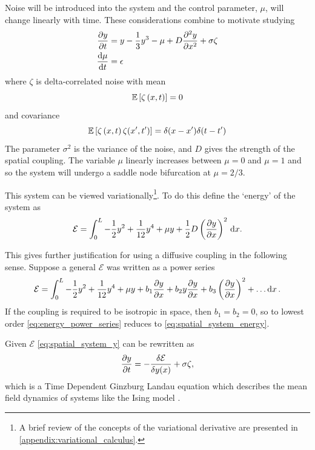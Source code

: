 Noise will be introduced into the system and the control parameter, $\mu$,  will change linearly with time. These considerations combine to motivate studying
\begin{subequations}
\label{eq:spatial_system}
  \begin{align}
    \pdv{y}{t} &= y - \frac{1}{3}y^3 - \mu + D\pdv[2]{y}{x} + \sigma\zeta \label{eq:spatial_system_y} \\
    \dv{\mu}{t}&= \epsilon \label{eq:spatial_system_mu}
  \end{align}
\end{subequations}
where $\zeta$ is delta-correlated noise with mean
\begin{equation}
  \label{eq:delta_mean}
  \operatorname*{\mathbb{E}} \left[\zeta\left(x,t\right)\right] = 0 
\end{equation}
and covariance
\begin{equation}
  \label{eq:delta_cov}
  \operatorname*{\mathbb{E}} \left[\zeta\left(x,t\right)\zeta(x',t')\right] = \delta(x-x')\delta(t-t') 
\end{equation}
The parameter $\sigma^2$ is the variance of the noise, and $D$ gives the strength of the spatial coupling.
The variable $\mu$ linearly increases between $\mu = 0$ and $\mu = 1$ and so the system will undergo a saddle node bifurcation at $\mu = 2/3$. 

This system can be viewed variationally\footnote{A brief review of the concepts of the variational derivative are presented in \cref{appendix:variational_calculus}.}.
To do this define the `energy' of the system as
\begin{equation}
  \label{eq:spatial_system_energy}
  \mathcal{E} = \int_0^L -\frac{1}{2}y^2 + \frac{1}{12}y^4 + \mu y + \frac{1}{2}D\left(\pdv{y}{x}\right)^2\,\mathrm{d}{x}.
\end{equation}

This gives further justification for using a diffusive coupling in the following sense. Suppose a general $\mathcal{E}$ was written as a power series
\begin{equation}
  \label{eq:energy_power_series}
  \mathcal{E} = \int_0^L  -\frac{1}{2}y^2 + \frac{1}{12}y^4 + \mu y + b_1 \pdv{y}{x} + b_2 y \pdv{y}{x} + b_3 \left(\pdv{y}{x}\right)^2 + \ldots \dd{x}.
\end{equation}
If the coupling is required to be isotropic in space, then $b_1 = b_2 = 0$, so to lowest order \cref{eq:energy_power_series} reduces to
\cref{eq:spatial_system_energy}.

Given $\mathcal{E}$ \cref{eq:spatial_system_y} can be rewritten as
\begin{equation}
  \label{eq:spatial_system_y_variational}
    \pdv{y}{t} = -\fdv{\mathcal{E}}{y(x)}  + \sigma\zeta, 
\end{equation}
which is a Time Dependent Ginzburg Landau equation which describes the mean field dynamics of systems like the Ising model \parencite{Goldenfeld1992}.

